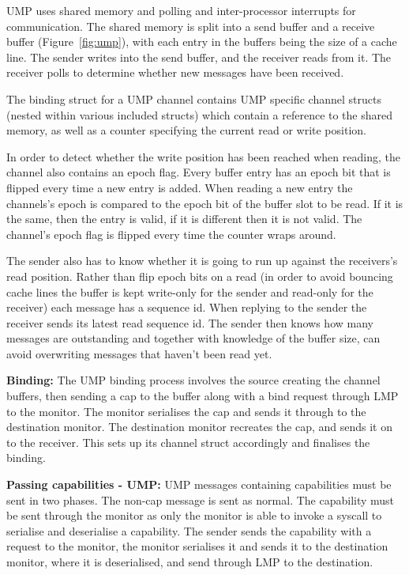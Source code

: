 \documentclass[a4paper,twoside]{report} %
\begin{document}
UMP uses shared memory and polling and inter-processor interrupts for
communication. The shared memory is split into a send buffer and a receive
buffer (Figure~\ref{fig:ump}), with each entry in the buffers being the size of
a cache line. The sender writes into the send buffer, and the receiver reads
from it. The receiver polls to determine whether new messages have been
received.

The binding struct for a UMP channel contains UMP specific channel structs
(nested within various included structs) which contain a reference to the shared
memory, as well as a counter specifying the current read or write position.

In order to detect whether the write position has been reached when reading, the
channel also contains an epoch flag. Every buffer entry has an epoch bit that is
flipped every time a new entry is added. When reading a new entry the channels's
epoch is compared to the epoch bit of the buffer slot to be read. If it is the
same, then the entry is valid, if it is different then it is not valid. The
channel's epoch flag is flipped every time the counter wraps around.

The sender also has to know whether it is going to run up against the
receivers's read position. Rather than flip epoch bits on a read (in order to
avoid bouncing cache lines the buffer is kept write-only for the sender and
read-only for the receiver) each message has a sequence id. When replying to the
sender the receiver sends its latest read sequence id. The sender then knows how
many messages are outstanding and together with knowledge of the buffer size,
can avoid overwriting messages that haven't been read yet.

\textbf{Binding:} The UMP binding process involves the source creating the
channel buffers, then sending a cap to the buffer along with a bind request
through LMP to the monitor. The monitor serialises the cap and sends it through
to the destination monitor. The destination monitor recreates the cap, and sends
it on to the receiver. This sets up its channel struct accordingly and finalises
the binding.

\textbf{Passing capabilities - UMP:} UMP messages containing capabilities must
be sent in two phases. The non-cap message is sent as normal. The capability
must be sent through the monitor as only the monitor is able to invoke a syscall
to serialise and deserialise a capability. The sender sends the capability with
a request to the monitor, the monitor serialises it and sends it to the
destination monitor, where it is deserialised, and send through LMP to the
destination.





\end{document}
